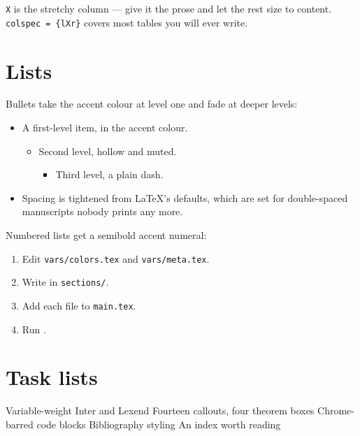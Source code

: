 \begin{note}
\texttt{X} is the stretchy column — give it the prose and let the rest size to
content. \texttt{colspec = \{lXr\}} covers most tables you will ever write.
\end{note}

\section{Lists}

Bullets take the accent colour at level one and fade at deeper levels:

\begin{itemize}
  \item A first-level item, in the accent colour.
  \begin{itemize}
    \item Second level, hollow and muted.
    \begin{itemize}
      \item Third level, a plain dash.
    \end{itemize}
  \end{itemize}
  \item Spacing is tightened from LaTeX's defaults, which are set for
        double-spaced manuscripts nobody prints any more.
\end{itemize}

Numbered lists get a semibold accent numeral:

\begin{enumerate}
  \item Edit \texttt{vars/colors.tex} and \texttt{vars/meta.tex}.
  \item Write in \texttt{sections/}.
  \item Add each file to \texttt{main.tex}.
  \item Run .
\end{enumerate}

\section{Task lists}

\begin{tasks}
  \task[done] Variable-weight Inter and Lexend
  \task[done] Fourteen callouts, four theorem boxes
  \task[done] Chrome-barred code blocks
  \task Bibliography styling
  \task An index worth reading
\end{tasks}

